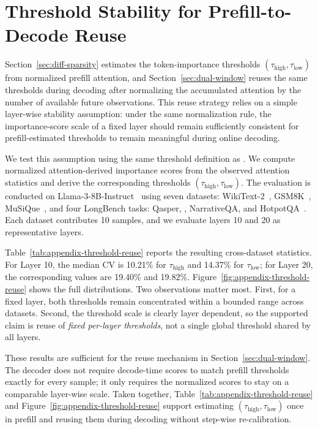 \section{Threshold Stability for Prefill-to-Decode Reuse}
\label{sec:appendix-threshold-reuse}

Section~\ref{sec:diff-sparsity} estimates the token-importance thresholds
$(\tau_{\text{high}}, \tau_{\text{low}})$ from normalized prefill attention,
and Section~\ref{sec:dual-window} reuses the same thresholds during decoding
after normalizing the accumulated attention by the number of available future
observations. This reuse strategy relies on a simple layer-wise stability
assumption: under the same normalization rule, the importance-score scale of a
fixed layer should remain sufficiently consistent for prefill-estimated
thresholds to remain meaningful during online decoding.

We test this assumption using the same threshold definition as \method. We
compute normalized attention-derived importance scores from the observed
attention statistics and derive the corresponding thresholds
$(\tau_{\text{high}}, \tau_{\text{low}})$. The evaluation is conducted on
Llama-3-8B-Instruct~\cite{grattafiori2024llama3} using seven datasets:
WikiText-2~\cite{merity2016pointer}, GSM8K~\cite{cobbe2021gsm8k},
MuSiQue~\cite{trivedi2022musique}, and four LongBench tasks: Qasper,
\multifieldqa, NarrativeQA, and HotpotQA~\cite{longbench}. Each dataset
contributes 10 samples, and we evaluate layers 10 and 20 as representative
layers.

Table~\ref{tab:appendix-threshold-reuse} reports the resulting cross-dataset
statistics. For Layer 10, the median CV is 10.21\% for
$\tau_{\text{high}}$ and 14.37\% for $\tau_{\text{low}}$; for Layer 20, the
corresponding values are 19.40\% and 19.82\%. Figure~\ref{fig:appendix-threshold-reuse}
shows the full distributions. Two observations matter most. First, for a fixed
layer, both thresholds remain concentrated within a bounded range across
datasets. Second, the threshold scale is clearly layer dependent, so the
supported claim is reuse of \emph{fixed per-layer thresholds}, not a single
global threshold shared by all layers.

These results are sufficient for the reuse mechanism in
Section~\ref{sec:dual-window}. The decoder does not require decode-time scores
to match prefill thresholds exactly for every sample; it only requires the
normalized scores to stay on a comparable layer-wise scale. Taken together,
Table~\ref{tab:appendix-threshold-reuse} and
Figure~\ref{fig:appendix-threshold-reuse} support estimating
$(\tau_{\text{high}}, \tau_{\text{low}})$ once in prefill and reusing them
during decoding without step-wise re-calibration.


